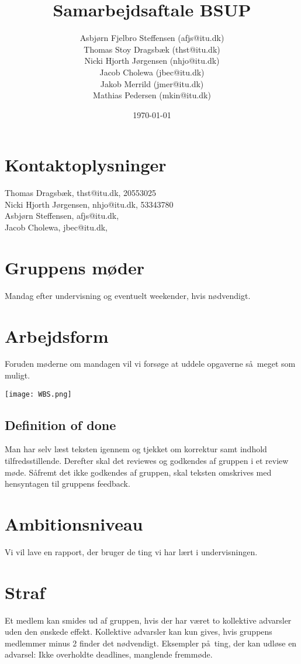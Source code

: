 \documentclass{article}
\title{Samarbejdsaftale BSUP}
\date{\today}
\author{Asbj\o rn Fjelbro Steffensen (afjs@itu.dk)\\ Thomas Stoy Dragsb\ae k (thst@itu.dk)\\ Nicki Hjorth J\o rgensen (nhjo@itu.dk)\\ Jacob Cholewa (jbec@itu.dk)\\ Jakob Merrild (jmer@itu.dk)\\ Mathias Pedersen (mkin@itu.dk)}
\begin{document}
\maketitle
\newpage

\section{Kontaktoplysninger}
Thomas Dragsb\ae k, thst@itu.dk, 20553025 \\
Nicki Hjorth J\o rgensen, nhjo@itu.dk, 53343780 \\
Asbjørn Steffensen, afjs@itu.dk, \\
Jacob Cholewa, jbec@itu.dk, 
\section{Gruppens m\o der}
Mandag efter undervisning og eventuelt weekender, hvis n\o dvendigt.

\section{Arbejdsform}
Foruden m\o derne om mandagen vil vi fors\o ge at uddele opgaverne s\aa \ meget som muligt.  

\texttt{[image: WBS.png]}
\begin{figure}

\end{figure}


\subsection{Definition of done}
Man har selv l\ae st teksten igennem og tjekket om korrektur samt indhold tilfredsstillende. Derefter skal det reviewes og godkendes af gruppen i et review møde. S\aa fremt det ikke godkendes af gruppen, skal teksten omskrives med hensyntagen til gruppens feedback.

\section{Ambitionsniveau}
Vi vil lave en rapport, der bruger de ting vi har l\ae rt i undervisningen.

\section{Straf}
Et medlem kan smides ud af gruppen, hvis der har v\ae ret to kollektive advarsler uden den \o nskede effekt. Kollektive advarsler kan kun gives, hvis gruppens medlemmer minus 2 finder det n\o dvendigt. Eksempler p\aa \ ting, der kan udl\o se en advarsel: Ikke overholdte deadlines, manglende fremm\o de.
\end{document}
